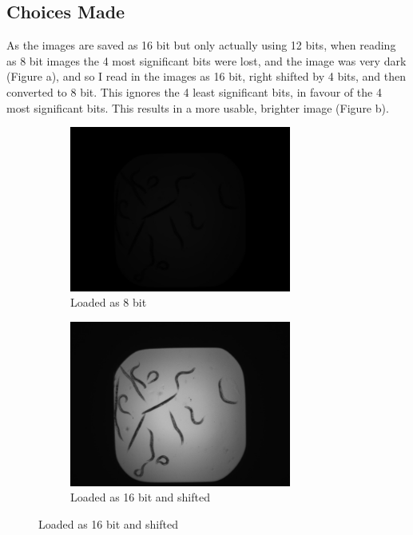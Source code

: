 \documentclass[a4paper,12pt]{article}
\begin{document}
\subsection*{Choices Made}
As the images are saved as 16 bit but only actually using 12 bits, when reading as 8 bit images the 4 most significant bits were lost, and the image was very dark (Figure a), and so I read in the images as 16 bit, right shifted by 4 bits, and then converted to 8 bit. This ignores the 4 least significant bits, in favour of the 4 most significant bits. This results in a more usable, brighter image (Figure b).\\
\begin{figure}[ht!]
    \centering
    \begin{subfigure}{0.45\textwidth}
        \centering
        \includegraphics[width=0.8\textwidth]{A01_step0_unshifted.jpg}
        \caption{Loaded as 8 bit}
    \end{subfigure}%
    \begin{subfigure}{0.45\textwidth}
        \centering
        \includegraphics[width=0.8\textwidth]{A01_step0.jpg}
        \caption{Loaded as 16 bit and shifted}
    \end{subfigure}
\end{figure}
\end{document}
